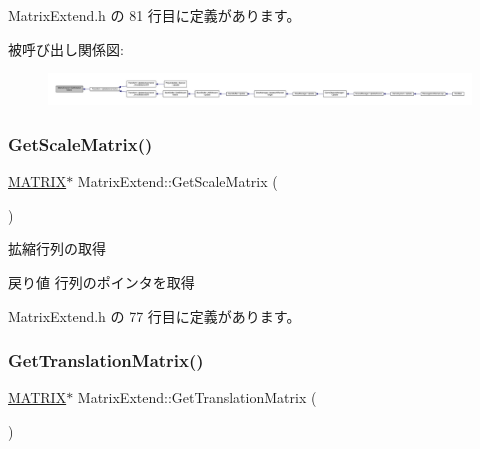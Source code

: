  Matrix\+Extend.\+h の 81 行目に定義があります。

被呼び出し関係図\+:
\nopagebreak
\begin{figure}[H]
\begin{center}
\leavevmode
\includegraphics[width=350pt]{class_matrix_extend_a6e10c2692b92f15ea4a1a69fc22c66c4_icgraph}
\end{center}
\end{figure}
\mbox{\label{class_matrix_extend_a13d6cb82385873959bde75fb64235943}} 
\subsubsection{\texorpdfstring{Get\+Scale\+Matrix()}{GetScaleMatrix()}}
{\footnotesize\ttfamily \mbox{\hyperlink{_vector3_d_8h_a032295cd9fb1b711757c90667278e744}{M\+A\+T\+R\+IX}}$\ast$ Matrix\+Extend\+::\+Get\+Scale\+Matrix (\begin{DoxyParamCaption}{ }\end{DoxyParamCaption})\hspace{0.3cm}{\ttfamily [inline]}}



拡縮行列の取得 

\begin{DoxyReturn}{戻り値}
行列のポインタを取得 
\end{DoxyReturn}


 Matrix\+Extend.\+h の 77 行目に定義があります。

\mbox{\label{class_matrix_extend_a95b114379190ca0fee5d40394f9842f1}} 
\subsubsection{\texorpdfstring{Get\+Translation\+Matrix()}{GetTranslationMatrix()}}
{\footnotesize\ttfamily \mbox{\hyperlink{_vector3_d_8h_a032295cd9fb1b711757c90667278e744}{M\+A\+T\+R\+IX}}$\ast$ Matrix\+Extend\+::\+Get\+Translation\+Matrix (\begin{DoxyParamCaption}{ }\end{DoxyParamCaption})\hspace{0.3cm}{\ttfamily [inline]}}




